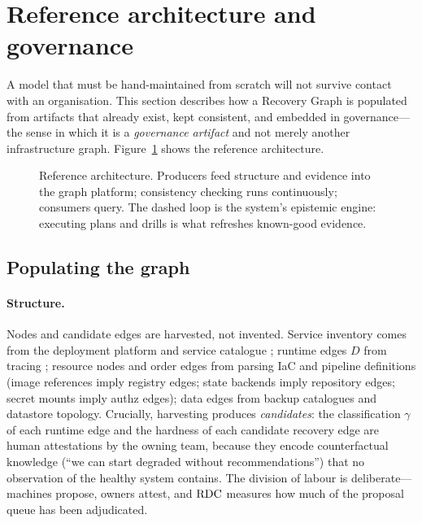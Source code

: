 \section{Reference architecture and governance}
\label{sec:architecture}

A model that must be hand-maintained from scratch will not survive contact with an organisation. This section describes how a Recovery Graph is populated from artifacts that already exist, kept consistent, and embedded in governance---the sense in which it is a \emph{governance artifact} and not merely another infrastructure graph. Figure~\ref{fig:architecture} shows the reference architecture.

\begin{figure}[t]
  \centering
  \resizebox{\textwidth}{!}{}
  \caption{Reference architecture. Producers feed structure and evidence into the graph platform; consistency checking runs continuously; consumers query. The dashed loop is the system's epistemic engine: executing plans and drills is what refreshes known-good evidence.}
  \label{fig:architecture}
\end{figure}

\subsection{Populating the graph}
\label{sec:populating}

\paragraph{Structure.} Nodes and candidate edges are harvested, not invented. Service inventory comes from the deployment platform and service catalogue \citep{backstage}; runtime edges $D$ from tracing \citep{sigelman2010dapper}; resource nodes and \textsf{order} edges from parsing IaC and pipeline definitions (image references imply registry edges; state backends imply repository edges; secret mounts imply \textsf{authz} edges); \textsf{data} edges from backup catalogues and datastore topology. Crucially, harvesting produces \emph{candidates}: the classification $\gamma$ of each runtime edge and the hardness of each candidate recovery edge are human attestations by the owning team, because they encode counterfactual knowledge (``we can start degraded without recommendations'') that no observation of the healthy system contains. The division of labour is deliberate---machines propose, owners attest, and $\mathrm{RDC}$ measures how much of the proposal queue has been adjudicated.

